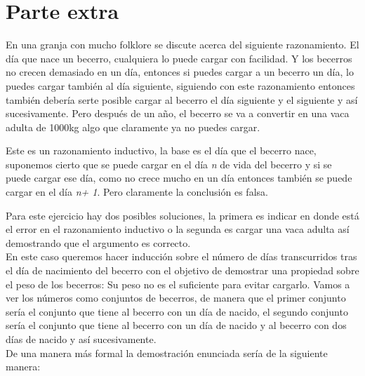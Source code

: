 \documentclass[spanish,12pt,letterpaper]{article}
\begin{document}
\section{Parte extra}
En una granja con mucho folklore se discute acerca del siguiente
razonamiento.  El día que nace un becerro, cualquiera lo puede cargar con
facilidad.  Y los becerros no crecen demasiado en un día,  entonces si puedes
cargar a un becerro un día,  lo puedes cargar también al día siguiente,
siguiendo con este razonamiento entonces también debería serte posible cargar al
becerro el día siguiente y el siguiente y así sucesivamente. Pero después de un
año, el becerro se va a convertir en una vaca adulta de 1000kg algo que
claramente ya no puedes cargar.

Este es un razonamiento inductivo, la base es el día que el becerro nace,
suponemos cierto que se puede cargar en el día \textit{n} de vida del becerro y
si se puede cargar ese día, como no crece mucho en un día entonces también se
puede cargar en el día \textit{n+ 1}.  Pero claramente la conclusión es falsa.

Para este ejercicio hay dos posibles soluciones,  la primera es indicar en donde
está el error en el razonamiento inductivo o la segunda es cargar una vaca adulta
así demostrando que el argumento es correcto.\\

\noindent En este caso queremos hacer inducción sobre el número de días transcurridos tras el día de nacimiento del becerro con el objetivo de
demostrar una propiedad sobre el peso de los becerros: Su
peso no es el suficiente para evitar cargarlo. Vamos a ver los números como
conjuntos de becerros, de manera que el primer conjunto sería el conjunto que
tiene al becerro con un día de nacido, el segundo conjunto sería el conjunto
que tiene al becerro con un día de nacido y al becerro con dos días de nacido y
así sucesivamente.\\
De una manera más formal la demostración enunciada sería de la
siguiente manera:\\
\end{document}
